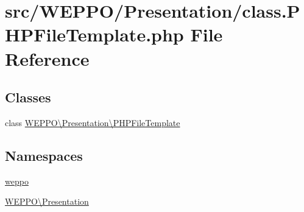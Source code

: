 \hypertarget{class_8PHPFileTemplate_8php}{}\section{src/\+W\+E\+P\+P\+O/\+Presentation/class.P\+H\+P\+File\+Template.\+php File Reference}
\label{class_8PHPFileTemplate_8php}
\subsection*{Classes}
\begin{DoxyCompactItemize}
\item 
class \hyperlink{classWEPPO_1_1Presentation_1_1PHPFileTemplate}{W\+E\+P\+P\+O\textbackslash{}\+Presentation\textbackslash{}\+P\+H\+P\+File\+Template}
\end{DoxyCompactItemize}
\subsection*{Namespaces}
\begin{DoxyCompactItemize}
\item 
 \hyperlink{namespaceweppo}{weppo}
\item 
 \hyperlink{namespaceWEPPO_1_1Presentation}{W\+E\+P\+P\+O\textbackslash{}\+Presentation}
\end{DoxyCompactItemize}
